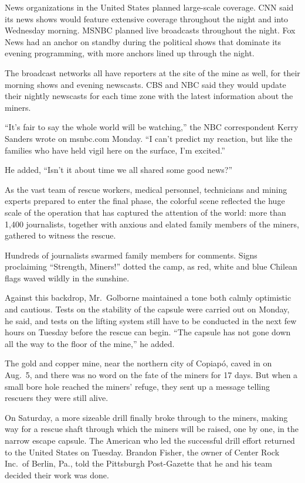 ﻿\documentclass[12pt]{article}
\begin{document}
News organizations in the United States planned large-scale coverage. CNN said its news shows would
feature extensive coverage throughout the night and into Wednesday morning. MSNBC planned live
broadcasts throughout the night. Fox News had an anchor on standby during the political shows that
dominate its evening programming, with more anchors lined up through the night.

The broadcast networks all have reporters at the site of the mine as well, for their morning shows
and evening newscasts. CBS and NBC said they would update their nightly newscasts for each time zone
with the latest information about the miners.

``It's fair to say the whole world will be watching,'' the NBC correspondent Kerry Sanders wrote on
msnbc.com Monday. ``I can't predict my reaction, but like the families who have held vigil here on
the surface, I'm excited.''

He added, ``Isn't it about time we all shared some good news?''

As the vast team of rescue workers, medical personnel, technicians and mining experts prepared to
enter the final phase, the colorful scene reflected the huge scale of the operation that has
captured the attention of the world: more than 1,400 journalists, together with anxious and elated
family members of the miners, gathered to witness the rescue.

Hundreds of journalists swarmed family members for comments. Signs proclaiming ``Strength, Miners!''
dotted the camp, as red, white and blue Chilean flags waved wildly in the sunshine.

Against this backdrop, Mr.~Golborne maintained a tone both calmly optimistic and cautious. Tests on
the stability of the capsule were carried out on Monday, he said, and tests on the lifting system
still have to be conducted in the next few hours on Tuesday before the rescue can begin. ``The
capsule has not gone down all the way to the floor of the mine,'' he added.

The gold and copper mine, near the northern city of Copiap\'o, caved in on Aug.~5, and there was no
word on the fate of the miners for 17 days. But when a small bore hole reached the miners' refuge,
they sent up a message telling rescuers they were still alive.

On Saturday, a more sizeable drill finally broke through to the miners, making way for a rescue
shaft through which the miners will be raised, one by one, in the narrow escape capsule. The
American who led the successful drill effort returned to the United States on Tuesday. Brandon
Fisher, the owner of Center Rock Inc.~of Berlin, Pa., told the Pittsburgh Post-Gazette that he and
his team decided their work was done.
\end{document}
